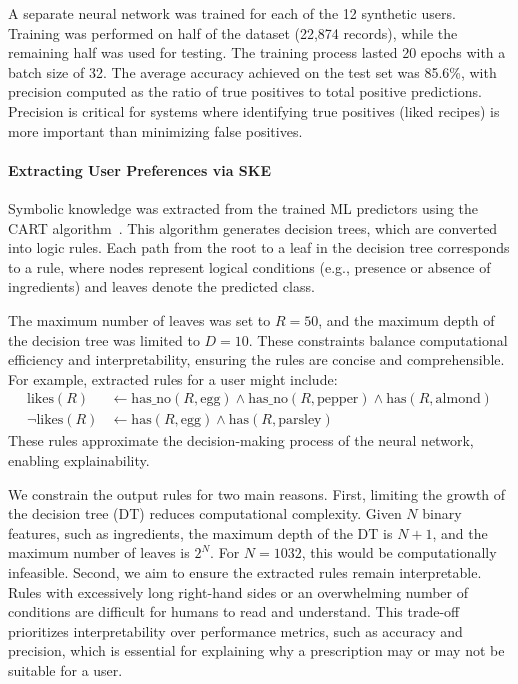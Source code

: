 A separate neural network was trained for each of the 12 synthetic users.
%
Training was performed on half of the dataset (22,874 records), while the remaining half was used for testing.
%
The training process lasted 20 epochs with a batch size of 32.
%
The average accuracy achieved on the test set was 85.6\%, with precision computed as the ratio of true positives to total positive predictions.
%
Precision is critical for systems where identifying true positives (liked recipes) is more important than minimizing false positives.

\paragraph{Extracting User Preferences via \Gls{SKE}}\label{par:extracting-user-preferences}
%

%
Symbolic knowledge was extracted from the trained \gls{ML} predictors using the CART algorithm~\cite{DBLP:books/wa/BreimanFOS84}.
%
This algorithm generates decision trees, which are converted into logic rules.
%
Each path from the root to a leaf in the decision tree corresponds to a rule, where nodes represent logical conditions (e.g., presence or absence of ingredients) and leaves denote the predicted class.

The maximum number of leaves was set to \( R = 50 \), and the maximum depth of the decision tree was limited to \( D = 10 \).
%
These constraints balance computational efficiency and interpretability, ensuring the rules are concise and comprehensible.
%
For example, extracted rules for a user might include:
%
\begin{align*}
  \text{likes}(R) &\leftarrow \text{has\_no}(R, \text{egg}) \land \text{has\_no}(R, \text{pepper}) \land \text{has}(R, \text{almond}) \\
  \neg \text{likes}(R) &\leftarrow \text{has}(R, \text{egg}) \land \text{has}(R, \text{parsley})
\end{align*}
%
These rules approximate the decision-making process of the neural network, enabling explainability.

We constrain the output rules for two main reasons.
%
First, limiting the growth of the decision tree (\gls{DT}) reduces computational complexity.
%
Given \(N\) binary features, such as ingredients, the maximum depth of the \gls{DT} is \(N + 1\), and the maximum number of leaves is \(2^N\).
%
For \(N = 1032\), this would be computationally infeasible.
%
Second, we aim to ensure the extracted rules remain interpretable.
%
Rules with excessively long right-hand sides or an overwhelming number of conditions are difficult for humans to read and understand.
%
This trade-off prioritizes interpretability over performance metrics, such as accuracy and precision, which is essential for explaining why a prescription may or may not be suitable for a user.

